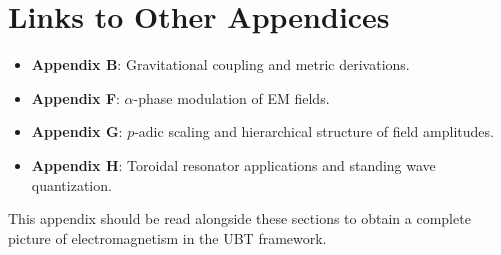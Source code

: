 \section{Links to Other Appendices}
\begin{itemize}
    \item \textbf{Appendix B}: Gravitational coupling and metric derivations.
    \item \textbf{Appendix F}: $\alpha$-phase modulation of EM fields.
    \item \textbf{Appendix G}: $p$-adic scaling and hierarchical structure of field amplitudes.
    \item \textbf{Appendix H}: Toroidal resonator applications and standing wave quantization.
\end{itemize}

This appendix should be read alongside these sections to obtain a complete picture of electromagnetism in the UBT framework.